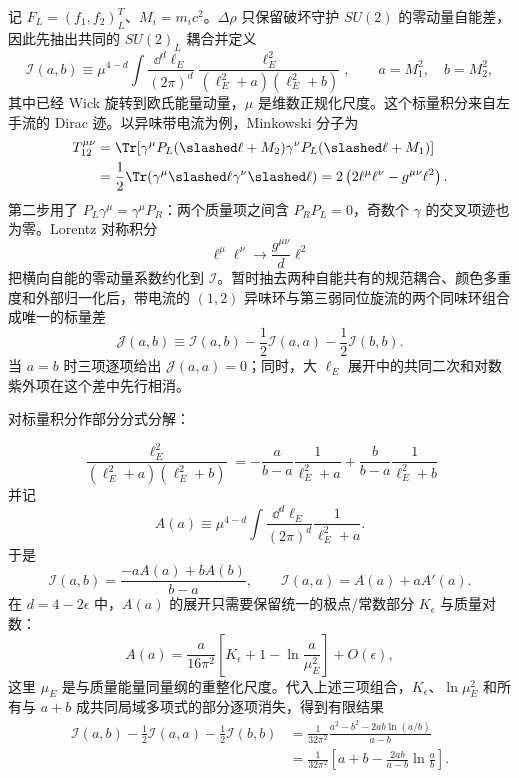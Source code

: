 \begin{derivation}[费米子质量分裂与电弱自能差]
记 $F_L=(f_1,f_2)_L^T$、$M_i=m_ic^2$。$\Delta\rho$ 只保留破坏守护 $SU(2)$ 的零动量自能差，因此先抽出共同的 $SU(2)_L$ 耦合并定义
\begin{equation*}
\mathcal I(a,b)
\equiv\mu^{4-d}\!\int\frac{\dd^d\ell_E}{(2\pi)^d}
\frac{\ell_E^2}{(\ell_E^2+a)(\ell_E^2+b)},
\qquad a=M_1^2,\quad b=M_2^2,
\end{equation*}
其中已经 Wick 旋转到欧氏能量动量，$\mu$ 是维数正规化尺度。这个标量积分来自左手流的 Dirac 迹。以异味带电流为例，Minkowski 分子为
\begin{align*}
T^{\mu\nu}_{12}
&=\Tr\!\left[\gamma^\mu P_L(\slashed\ell+M_2)
\gamma^\nu P_L(\slashed\ell+M_1)\right]\\
&=\frac12\Tr(\gamma^\mu\slashed\ell\gamma^\nu\slashed\ell)
=2\left(2\ell^\mu\ell^\nu-g^{\mu\nu}\ell^2\right).
\end{align*}
第二步用了 $P_L\gamma^\mu=\gamma^\mu P_R$：两个质量项之间含 $P_RP_L=0$，奇数个 $\gamma$ 的交叉项迹也为零。Lorentz 对称积分
\begin{equation*}
\ell^\mu\ell^\nu\longrightarrow\frac{g^{\mu\nu}}{d}\ell^2
\end{equation*}
把横向自能的零动量系数约化到 $\mathcal I$。暂时抽去两种自能共有的规范耦合、颜色多重度和外部归一化后，带电流的 $(1,2)$ 异味环与第三弱同位旋流的两个同味环组合成唯一的标量差
\begin{equation*}
\mathcal J(a,b)
\equiv
\mathcal I(a,b)-\frac12\mathcal I(a,a)-\frac12\mathcal I(b,b).
\end{equation*}
当 $a=b$ 时三项逐项给出 $\mathcal J(a,a)=0$；同时，大 $\ell_E$ 展开中的共同二次和对数紫外项在这个差中先行相消。

对标量积分作部分分式分解：

\begin{equation*}
\frac{\ell_E^2}{(\ell_E^2+a)(\ell_E^2+b)}
=-\frac{a}{b-a}\frac1{\ell_E^2+a}
+\frac{b}{b-a}\frac1{\ell_E^2+b}
\end{equation*}
并记
\begin{equation*}
A(a)\equiv\mu^{4-d}\int\frac{\dd^d\ell_E}{(2\pi)^d}\frac1{\ell_E^2+a}.
\end{equation*}
于是
\begin{equation*}
\mathcal I(a,b)=\frac{-aA(a)+bA(b)}{b-a},
\qquad
\mathcal I(a,a)=A(a)+aA'(a).
\end{equation*}
在 $d=4-2\epsilon$ 中，$A(a)$ 的展开只需要保留统一的极点/常数部分 $K_\epsilon$ 与质量对数：
\begin{equation*}
A(a)=\frac{a}{16\pi^2}
\left[K_\epsilon+1-\ln\frac{a}{\mu_E^2}\right]+O(\epsilon),
\end{equation*}
这里 $\mu_E$ 是与质量能量同量纲的重整化尺度。代入上述三项组合，$K_\epsilon$、$\ln\mu_E^2$ 和所有与 $a+b$ 成共同局域多项式的部分逐项消失，得到有限结果
\begin{align*}
\mathcal I(a,b)-\frac12\mathcal I(a,a)-\frac12\mathcal I(b,b)
&=\frac{1}{32\pi^2}
\frac{a^2-b^2-2ab\ln(a/b)}{a-b}\\
&=\frac{1}{32\pi^2}
\left[a+b-\frac{2ab}{a-b}\ln\frac ab\right].
\end{align*}


\end{derivation}
